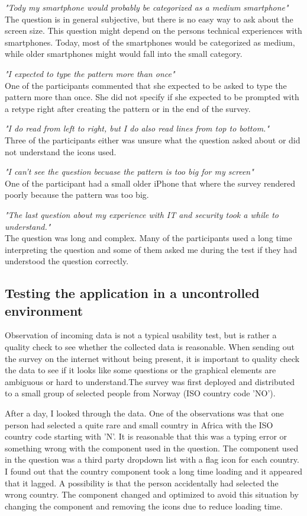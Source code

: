     {\it "Tody my smartphone would probably be categorized as a medium smartphone"}\\The question is in general subjective, but there is no easy way to ask about the screen size. This question might depend on the persons technical experiences with smartphones. Today, most of the smartphones would be categorized as medium, while older smartphones might would fall into the small category.
      
    {\it "I expected to type the pattern more than once"}\\ 
    One of the participants commented that she expected to be asked to type the pattern more than once. She did not specify if she expected to be prompted with a retype right after creating the pattern or in the end of the survey.
      
    {\it "I do read from left to right, but I do also read lines from top to bottom."}\\ 
    Three of the participants either was unsure what the question asked about or did not understand the icons used. 
      
    {\it "I can't see the question becuase the pattern is too big for my screen"}\\
    One of the participant had a small older iPhone that where the survey rendered poorly because the pattern was too big. 
      
    {\it "The last question about my experience with IT and security took a while to understand."}\\ 
    The question was long and complex. Many of the participants used a long time interpreting the question and some of them asked me during the test if they had understood the question correctly.

    \subsection{Testing the application in a uncontrolled environment}
    Observation of incoming data is not a typical usability test, but is rather a quality check to see whether the collected data is reasonable. When sending out the survey on the internet without being present, it is important to quality check the data to see if it looks like some questions or the graphical elements are ambiguous or hard to understand.The survey was first deployed and distributed to a small group of selected people from Norway (ISO country code 'NO').

    After a day, I looked through the data. One of the observations was that one person had selected a quite rare and small country in Africa with the ISO country code starting with 'N'. It is reasonable that this was a typing error or something wrong with the component used in the question. The component used in the question was a third party dropdown list with a flag icon for each country. I found out that the country component took a long time loading and it appeared that it lagged. A possibility is that the person accidentally had selected the wrong country. The component changed and optimized to avoid this situation by changing the component and removing the icons due to reduce loading time.

